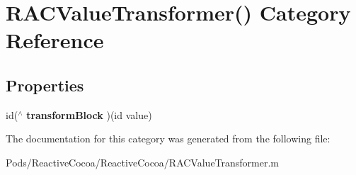\hypertarget{category_r_a_c_value_transformer_07_08}{}\section{R\+A\+C\+Value\+Transformer() Category Reference}
\label{category_r_a_c_value_transformer_07_08}
\subsection*{Properties}
\begin{DoxyCompactItemize}
\item 
\mbox{\label{category_r_a_c_value_transformer_07_08_af7ea7baf79b441ef96a6a8f107839ae7}} 
id($^\wedge$ {\bfseries transform\+Block} )(id value)
\end{DoxyCompactItemize}


The documentation for this category was generated from the following file\+:\begin{DoxyCompactItemize}
\item 
Pods/\+Reactive\+Cocoa/\+Reactive\+Cocoa/R\+A\+C\+Value\+Transformer.\+m\end{DoxyCompactItemize}
